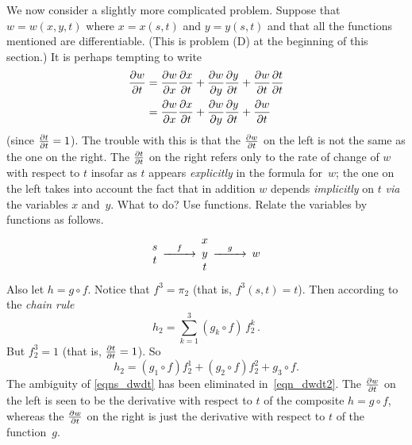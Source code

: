 We now consider a slightly more complicated problem.  Suppose that $w = w(x,y,t)$ where $x =
x(s,t)$ and $y = y(s,t)$ and that all the functions mentioned are differentiable.  (This is
problem (D) at the beginning of this section.)  It is perhaps tempting to write
 \begin{equation}\label{eqns_dwdt}
  \begin{aligned}
   \frac{\partial w}{\partial t} &= \frac{\partial w}{\partial x}\frac{\partial x}{\partial t} + \frac{\partial w}{\partial y}\frac{\partial y}{\partial t} + \frac{\partial w}{\partial t}\frac{\partial t}{\partial t} \\
          &= \frac{\partial w}{\partial x}\frac{\partial x}{\partial t} + \frac{\partial w}{\partial y}\frac{\partial y}{\partial t} + \frac{\partial w}{\partial t}
  \end{aligned}
 \end{equation}
(since $\frac{\partial t}{\partial t} = 1$).  The trouble with this is that the $\frac{\partial w}{\partial t}$ on the left is not the same
as the one on the right.  The $\frac{\partial t}{\partial t}$ on the right refers only to the rate of change of $w$
with respect to $t$ insofar as $t$ appears \emph{explicitly} in the formula for~$w$; the one
on the left takes into account the fact that in addition $w$ depends \emph{implicitly} on $t$
\emph{via} the variables $x$ and~$y$.  What to do?  Use functions.  Relate the variables by
functions as follows.
 \begin{equation}\label{pic_vars1}
  \begin{CD}
   \begin{matrix} s \\ t \end{matrix}  @>f>>
   \begin{matrix} x  \\ y \\ t \end{matrix} @>g>> w
  \end{CD}
 \end{equation}
Also let $h = g \circ f$.  Notice that $f^3 = \pi_2$ (that is, $f^3(s,t) = t$).  Then
according to the \emph{chain rule}
  \[ h_2 = \sum_{k=1}^3 (g_k \circ f)\, f_2^k\,. \]
But $f_2^3 = 1$ (that is, $\frac{\partial t}{\partial t} = 1$).  So
 \begin{equation}\label{eqn_dwdt2}
    h_2 = (g_1 \circ f)f_2^1 + (g_2 \circ f)f_2^2 + g_3 \circ f.
 \end{equation}
The ambiguity of \eqref{eqns_dwdt} has been eliminated in~\eqref{eqn_dwdt2}.  The $\frac{\partial w}{\partial t}$ on
the left is seen to be the derivative with respect to $t$ of the composite $h = g \circ f$,
whereas the $\frac{\partial w}{\partial t}$ on the right is just the derivative with respect to $t$ of the
function~$g$.


